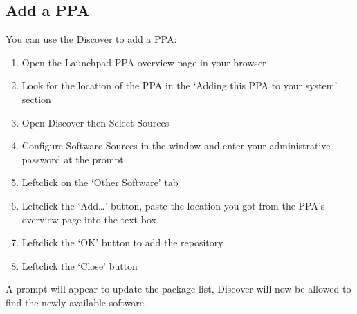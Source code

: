 \documentclass[letterpaper,10pt,english]{sphinxmanual}
\begin{document}
\subsection{Add a PPA}
\label{\detokenize{docs/repositories:add-a-ppa}}
\sphinxAtStartPar
You can use the Discover to add a PPA:
\begin{enumerate}
%
\item {} 
\sphinxAtStartPar
Open the Launchpad PPA overview page in your browser

\item {} 
\sphinxAtStartPar
Look for the location of the PPA in the ‘Adding this PPA to your system’ section

\item {} 
\sphinxAtStartPar
Open Discover then Select Sources

\item {} 
\sphinxAtStartPar
Configure Software Sources in the window and enter your administrative password at the prompt

\item {} 
\sphinxAtStartPar
Left\sphinxhyphen{}click on the ‘Other Software’ tab

\item {} 
\sphinxAtStartPar
Left\sphinxhyphen{}click the ‘Add…’ button, paste the location you got from the PPA’s overview page into the text box

\item {} 
\sphinxAtStartPar
Left\sphinxhyphen{}click the ‘OK’ button to add the repository

\item {} 
\sphinxAtStartPar
Left\sphinxhyphen{}click the ‘Close’ button

\end{enumerate}

\sphinxAtStartPar
A prompt will appear to update the package list, Discover will now be allowed to find the newly available software.
\end{document}
